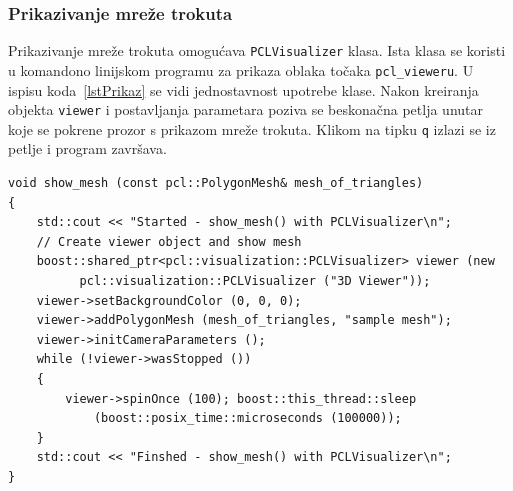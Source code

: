 
\subsubsection{Prikazivanje mreže trokuta} %
\label{ssub:Prikazivanje mreže trokuta}
Prikazivanje mreže trokuta omogućava \texttt{PCLVisualizer} klasa. Ista
klasa se koristi u komandono linijskom programu za prikaza oblaka točaka
\texttt{pcl\_vieweru}. U ispisu koda~\ref{lstPrikaz} se vidi
jednostavnost upotrebe klase. Nakon kreiranja objekta \texttt{viewer} i
postavljanja parametara poziva se beskonačna petlja unutar koje se
pokrene prozor s prikazom mreže trokuta. Klikom na tipku \texttt{q}
izlazi se iz petlje i program završava.

\begin{lstlisting}[label=lstPrikaz,caption={Izvorni kod funkcije
\texttt{show\_mesh()} }]
void show_mesh (const pcl::PolygonMesh& mesh_of_triangles)
{
    std::cout << "Started - show_mesh() with PCLVisualizer\n";
    // Create viewer object and show mesh
    boost::shared_ptr<pcl::visualization::PCLVisualizer> viewer (new
          pcl::visualization::PCLVisualizer ("3D Viewer"));
    viewer->setBackgroundColor (0, 0, 0);
    viewer->addPolygonMesh (mesh_of_triangles, "sample mesh");
    viewer->initCameraParameters (); 
    while (!viewer->wasStopped ())
    {
        viewer->spinOnce (100); boost::this_thread::sleep
            (boost::posix_time::microseconds (100000));
    }
    std::cout << "Finshed - show_mesh() with PCLVisualizer\n";
}
\end{lstlisting}



